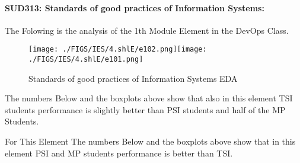 \documentclass[12pt]{extreport}
\begin{document}

\paragraph{\large SUD313: Standards of good practices of Information Systems:\\
} 
The Folowing is the analysis of the 1th Module Element in the DevOps Class.

\begin{figure}[H]
	\centering
	\texttt{[image: ./FIGS/IES/4.shlE/e102.png]}\texttt{[image: ./FIGS/IES/4.shlE/e101.png]}
	\caption{Standards of good practices of Information Systems EDA}
	\label{fig:53}
\end{figure}

The numbers Below and the boxplots above show that also in this element  TSI students performance is slightly better than PSI students and half of the MP Students.

For This Element The numbers Below and the boxplots above show that in this element  PSI and MP students performance is  better than TSI.
\end{document}
